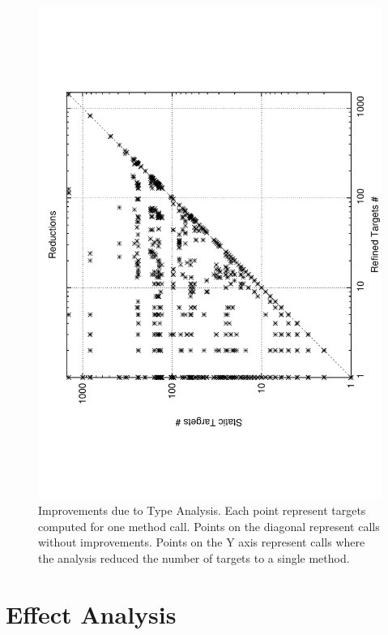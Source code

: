 \documentclass[a4paper]{article}
\begin{document}
\begin{figure}[h]
    \begin{center}
    \includegraphics[scale=0.6]{images/scatter}
    \end{center}
    \caption{Improvements due to Type Analysis. Each point represent targets
    computed for one method call. Points on the diagonal represent calls
    without improvements. Points on the Y axis represent calls where the
    analysis reduced the number of targets to a single method.}
    \label{fig:scatter}
\end{figure}

\section{Effect Analysis}
\end{document}
